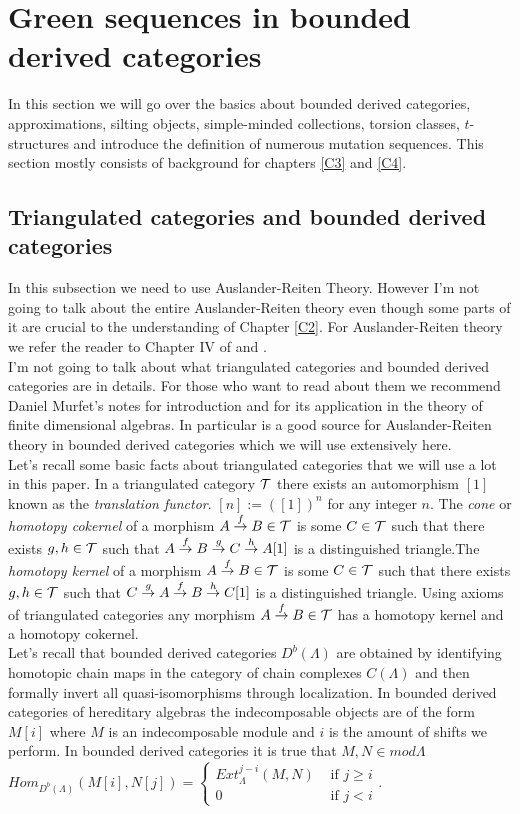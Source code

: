 \section{Green sequences in bounded derived categories}
\indent In this section we will go over the basics about bounded derived categories, approximations, silting objects, simple-minded collections, torsion classes, $t$-structures and introduce the definition of numerous mutation sequences. This section mostly consists of background for chapters \ref{C3} and \ref{C4}.\\
\subsection{Triangulated categories and bounded derived categories}
\indent In this subsection we need to use Auslander-Reiten Theory. However I'm not going to talk about the entire Auslander-Reiten theory even though some parts of it are crucial to the understanding of Chapter \ref{C2}. For Auslander-Reiten theory we refer the reader to Chapter IV of \cite{ASS06} and \cite{ARS}.\\
\indent I'm not going to talk about what triangulated categories and bounded derived categories are in details. For those who want to read about them we recommend Daniel Murfet's notes \cite{MurD1}\cite{MurD2}\cite{MurT1} for introduction and \cite{H88} for its application in the theory of finite dimensional algebras. In particular \cite{H88} is a good source for Auslander-Reiten theory in bounded derived categories which we will use extensively here.\\
\indent Let's recall some basic facts about triangulated categories that we will use a lot in this paper. In a triangulated category $\mathcal{T}$ there exists an automorphism $[1]$ known as the \textit{translation functor}. $[n]:=([1])^n$ for any integer $n$. The \textit{cone} or \textit{homotopy cokernel} of a morphism $A\overset{f}{\to}B\in\mathcal{T}$ is some $C\in\mathcal{T}$ such that there exists $g,h\in\mathcal{T}$ such that $A\overset{f}{\to} B\overset{g}{\to} C\overset{h}{\to} A[1]$ is a distinguished triangle.The \textit{homotopy kernel} of a morphism $A\overset{f}{\to}B\in\mathcal{T}$ is some $C\in\mathcal{T}$ such that there exists $g,h\in\mathcal{T}$ such that $C\overset{g}{\to} A\overset{f}{\to} B\overset{h}{\to} C[1]$ is a distinguished triangle. Using axioms of triangulated categories any morphism $A\overset{f}{\to}B\in\mathcal{T}$ has a homotopy kernel and a homotopy cokernel.\\
\indent Let's recall that bounded derived categories $D^b(\Lambda)$ are obtained by identifying homotopic chain maps in the category of chain complexes $C({\Lambda})$ and then formally invert all quasi-isomorphisms through localization. In bounded derived categories of hereditary algebras the indecomposable objects are of the form $M[i]$ where $M$ is an indecomposable module and $i$ is the amount of shifts we perform. In bounded derived categories it is true that $M,N\in mod\Lambda$ $Hom_{D^b(\Lambda)}(M[i],N[j])=\begin{cases}
Ext_{\Lambda}^{j-i}(M,N) & \text{ if }j\geq i\\
0 & \text{ if }j<i
\end{cases}$.\\

